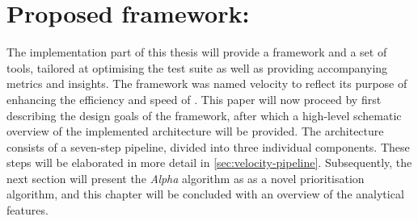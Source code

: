 
\chapter{Proposed framework: \velocity{}}
\label{ch:velocity}
The implementation part of this thesis will provide a framework and a set of tools, tailored at optimising the test suite as well as providing accompanying metrics and insights. The framework was named \Gls{velocity} to reflect its purpose of enhancing the efficiency and speed of \CI{}. This paper will now proceed by first describing the design goals of the framework, after which a high-level schematic overview of the implemented architecture will be provided. The architecture consists of a seven-step pipeline, divided into three individual components. These steps will be elaborated in more detail in \cref{sec:velocity-pipeline}. Subsequently, the next section will present the \emph{Alpha} algorithm as as a novel prioritisation algorithm, and this chapter will be concluded with an overview of the analytical features.


\clearpage

\clearpage

\clearpage

\clearpage
